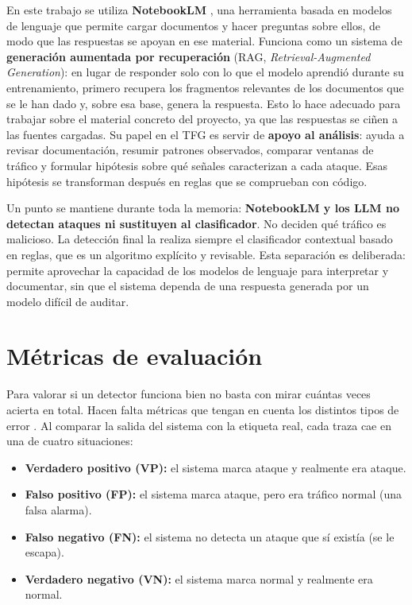 En este trabajo se utiliza \textbf{NotebookLM} \cite{notebooklm}, una herramienta basada en modelos de lenguaje que permite cargar documentos y hacer preguntas sobre ellos, de modo que las respuestas se apoyan en ese material. Funciona como un sistema de \textbf{generación aumentada por recuperación} (RAG, \emph{Retrieval-Augmented Generation}): en lugar de responder solo con lo que el modelo aprendió durante su entrenamiento, primero recupera los fragmentos relevantes de los documentos que se le han dado y, sobre esa base, genera la respuesta. Esto lo hace adecuado para trabajar sobre el material concreto del proyecto, ya que las respuestas se ciñen a las fuentes cargadas. Su papel en el TFG es servir de \textbf{apoyo al análisis}: ayuda a revisar documentación, resumir patrones observados, comparar ventanas de tráfico y formular hipótesis sobre qué señales caracterizan a cada ataque. Esas hipótesis se transforman después en reglas que se comprueban con código.

Un punto se mantiene durante toda la memoria: \textbf{NotebookLM y los LLM no detectan ataques ni sustituyen al clasificador}. No deciden qué tráfico es malicioso. La detección final la realiza siempre el clasificador contextual basado en reglas, que es un algoritmo explícito y revisable. Esta separación es deliberada: permite aprovechar la capacidad de los modelos de lenguaje para interpretar y documentar, sin que el sistema dependa de una respuesta generada por un modelo difícil de auditar.

\section{Métricas de evaluación}
\label{sec:concep_metricas}

Para valorar si un detector funciona bien no basta con mirar cuántas veces acierta en total. Hacen falta métricas que tengan en cuenta los distintos tipos de error \cite{sokolova2009systematic}. Al comparar la salida del sistema con la etiqueta real, cada traza cae en una de cuatro situaciones:

\begin{itemize}
  \item \textbf{Verdadero positivo (VP):} el sistema marca ataque y realmente era ataque.
  \item \textbf{Falso positivo (FP):} el sistema marca ataque, pero era tráfico normal (una falsa alarma).
  \item \textbf{Falso negativo (FN):} el sistema no detecta un ataque que sí existía (se le escapa).
  \item \textbf{Verdadero negativo (VN):} el sistema marca normal y realmente era normal.
\end{itemize}


